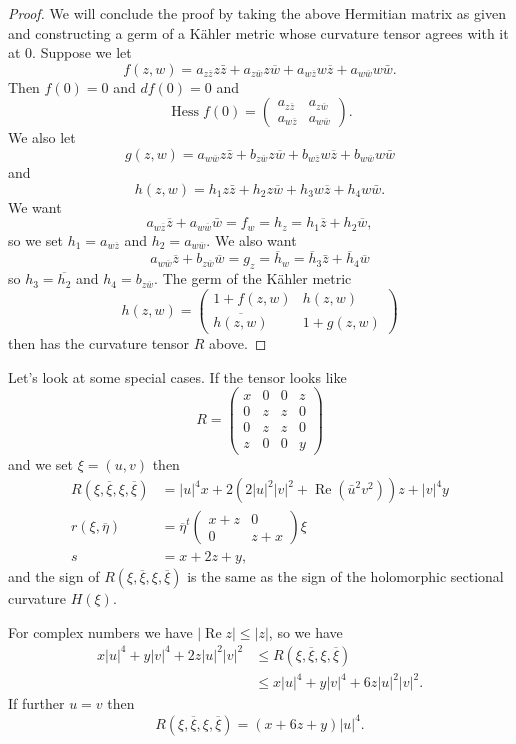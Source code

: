 \documentclass[10pt,a4paper]{amsart}
\theoremstyle{definition}
\def\ov#1{\overline{#1}}
\DeclareMathOperator{\re}{Re}
\begin{document}
\begin{proof}
We will conclude the proof by taking the above Hermitian matrix as given and
constructing a germ of a K\"ahler metric whose curvature tensor agrees with it
at $0$.
Suppose we let
$$
f(z,w)
= a_{z \ov z} z \bar z
+ a_{z \ov w} z \ov w
+ a_{w \ov z} w \ov z
+ a_{w \ov w} w \bar w.
$$
Then $f(0) = 0$ and $df(0) = 0$ and
$$
\operatorname{Hess} f(0)
= \begin{pmatrix}
a_{z \ov z} & a_{z \ov w}
\\
a_{w \ov z} & a_{w \ov w}
\end{pmatrix}.
$$
We also let
$$
g(z,w)
= a_{w \ov w} z \bar z
+ b_{z \ov w} z \ov w
+ b_{w \ov z} w \ov z
+ b_{w \ov w} w \bar w
$$
and
$$
h(z,w)
= h_1 z \bar z
+ h_2 z \ov w
+ h_3 w \ov z
+ h_4 w \bar w.
$$
We want
$$
a_{w \ov z} \ov z + a_{w \ov w} \bar w
= f_w = h_z
= h_1 \ov z + h_2 \ov w,
$$
so we set $h_1 = a_{w \ov z}$ and $h_2 = a_{w \ov w}$.
We also want
$$
a_{w \ov w} \ov z + b_{z \ov w} \ov w
= g_z = \ov h_w
= \ov h_3 \bar z + \ov h_4 \ov w
$$
so $h_3 = \ov{h_2}$ and $h_4 = b_{z \ov w}$.
The germ of the K\"ahler metric
$$
h(z,w)
= \begin{pmatrix}
1 + f(z,w) & h(z,w)
\\
\ov{h(z,w)} & 1 + g(z,w)
\end{pmatrix}
$$
then has the curvature tensor $R$ above.
\end{proof}

Let's look at some special cases. If the tensor looks like
$$
R =
\begin{pmatrix}
x & 0 & 0 & z
\\
0 & z & z & 0
\\
0 & z & z & 0
\\
z & 0 & 0 & y
\end{pmatrix}
$$
and we set $\xi = (u, v)$ then
\begin{align*}
R(\xi, \ov \xi, \xi, \ov \xi)
&= |u|^4 x + 2 (2 |u|^2 |v|^2 + \re(\bar u^2 v^2))z + |v|^4 y
\\
r(\xi, \ov \eta)
&=
\ov\eta^t
\begin{pmatrix}
x + z & 0 \\ 0 & z + x
\end{pmatrix}
\xi
\\
s &= x + 2z + y,
\end{align*}
and the sign of $R(\xi, \ov \xi, \xi, \ov \xi)$ is the same as the sign of the
holomorphic sectional curvature $H(\xi)$.

For complex numbers we have $|\re z| \leq |z|$, so we have
\begin{align*}
x |u|^4 + y |v|^4 + 2z |u|^2 |v|^2
&\leq R(\xi, \ov \xi, \xi, \ov \xi)
\\
&\leq x |u|^4 + y |v|^4 + 6z |u|^2 |v|^2.
\end{align*}
If further $u = v$ then
$$
R(\xi, \ov \xi, \xi, \ov \xi)
= (x + 6z + y) |u|^4.
$$
\end{document}
